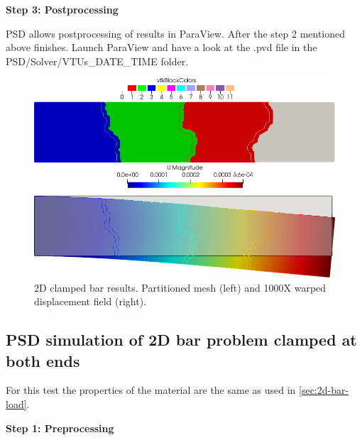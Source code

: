 \textbf{Step 3: Postprocessing}

PSD allows postprocessing of results in ParaView. After the step 2 mentioned above finishes. Launch ParaView and have a look at the  {\ttfamily .pvd} file in the  {\ttfamily PSD/Solver/VTUs\_DATE\_TIME} folder. 

\begin{figure}[htbp]
    \centering
    \begin{minipage}[t][2cm][t]{0.4\textwidth}
    \includegraphics[align=t,width=1\textwidth]{./Images/2d-bar-partioned.png}
    \end{minipage}\hspace{.1\textwidth}
    \begin{minipage}[t][2cm][t]{0.4\textwidth}
    \includegraphics[align=t,width=1\textwidth]{./Images/2d-bar-results.png}
    \end{minipage}
    \caption{2D clamped bar results. Partitioned mesh (left) and 1000X warped displacement field (right).}
    \label{fig:2d-bar-results}
\end{figure}


\subsection{PSD simulation of 2D bar problem clamped at both ends \label{sec:2D-bar-clamped1}}

For this test the properties of the material are the same as used in \cref{sec:2d-bar-load}. 

\textbf{Step 1: Preprocessing}


